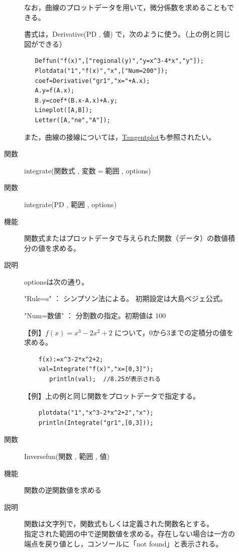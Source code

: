 \documentclass[papersize,a4paper,12pt,uplatex]{jsarticle}
\begin{document}
\begin{description}
\begin{description}
なお，曲線のプロットデータを用いて，微分係数を求めることもできる。

書式は，Derivative(PD ,  値) で，次のように使う。（上の例と同じ図ができる）

\begin{verbatim}
   Deffun("f(x)",["regional(y)","y=x^3-4*x","y"]);
   Plotdata("1","f(x)","x",["Num=200"]);
   coef=Derivative("gr1","x="+A.x);
   A.y=f(A.x);
   B.y=coef*(B.x-A.x)+A.y;
   Lineplot([A,B]);
   Letter([A,"ne","A"]);
\end{verbatim}

また，曲線の接線については，\hyperlink{tangentplot}{Tangentplot}も参照されたい。


\vspace{\baselineskip}
\hypertarget{integrate}{}
\item[関数]  integrate(関数式 , 変数$=$範囲 , options)
\item[関数]  integrate(PD , 範囲 , options)
\item[機能]  関数式またはプロットデータで与えられた関数（データ）の数値積分の値を求める。
\item[説明]  optionsは次の通り。

  "Rule=s"    ：  シンプソン法による。 初期設定は大島ベジェ公式。
  
  "Num=数値"  ：  分割数の指定。初期値は 100 

\vspace{\baselineskip}
【例】$f(x)=x^3-2x^2+2$ について，0から3までの定積分の値を求める。
\begin{verbatim}
    f(x):=x^3-2*x^2+2;
    val=Integrate("f(x)","x=[0,3]");
       println(val);  //8.25が表示される
\end{verbatim}

\vspace{\baselineskip}
【例】上の例と同じ関数をプロットデータで指定する。
\begin{verbatim}
    plotdata("1","x^3-2*x^2+2","x");
    println(Integrate("gr1",[0,3]));
\end{verbatim}

\vspace{\baselineskip}
\hypertarget{inversefun}{}
\item[関数]  Inversefun(関数 , 範囲 , 値)
\item[機能]  関数の逆関数値を求める
\item[説明]  関数は文字列で，関数式もしくは定義された関数名とする。\\
  指定された範囲の中で逆関数値を求める。存在しない場合は一方の端点を戻り値とし，コンソールに「not found」と表示される。
  

\end{description}
\end{description}
\end{document}

